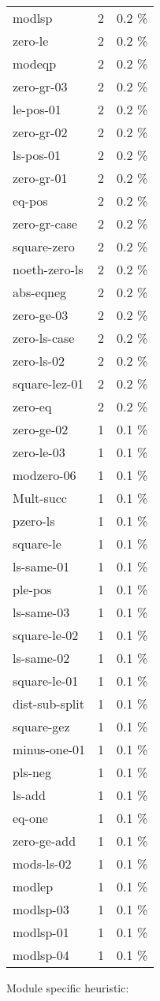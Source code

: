\documentclass[a4paper]{article}
\begin{document}
\begin{supertabular}{l|r|r}
modlsp & 2 & 0.2 \% \\
zero-le & 2 & 0.2 \% \\
modeqp & 2 & 0.2 \% \\
zero-gr-03 & 2 & 0.2 \% \\
le-pos-01 & 2 & 0.2 \% \\
zero-gr-02 & 2 & 0.2 \% \\
ls-pos-01 & 2 & 0.2 \% \\
zero-gr-01 & 2 & 0.2 \% \\
eq-pos & 2 & 0.2 \% \\
zero-gr-case & 2 & 0.2 \% \\
square-zero & 2 & 0.2 \% \\
noeth-zero-ls & 2 & 0.2 \% \\
abs-eqneg & 2 & 0.2 \% \\
zero-ge-03 & 2 & 0.2 \% \\
zero-ls-case & 2 & 0.2 \% \\
zero-ls-02 & 2 & 0.2 \% \\
square-lez-01 & 2 & 0.2 \% \\
zero-eq & 2 & 0.2 \% \\
zero-ge-02 & 1 & 0.1 \% \\
zero-le-03 & 1 & 0.1 \% \\
modzero-06 & 1 & 0.1 \% \\
Mult-succ & 1 & 0.1 \% \\
pzero-ls & 1 & 0.1 \% \\
square-le & 1 & 0.1 \% \\
ls-same-01 & 1 & 0.1 \% \\
ple-pos & 1 & 0.1 \% \\
ls-same-03 & 1 & 0.1 \% \\
square-le-02 & 1 & 0.1 \% \\
ls-same-02 & 1 & 0.1 \% \\
square-le-01 & 1 & 0.1 \% \\
dist-sub-split & 1 & 0.1 \% \\
square-gez & 1 & 0.1 \% \\
minus-one-01 & 1 & 0.1 \% \\
pls-neg & 1 & 0.1 \% \\
ls-add & 1 & 0.1 \% \\
eq-one & 1 & 0.1 \% \\
zero-ge-add & 1 & 0.1 \% \\
mods-ls-02 & 1 & 0.1 \% \\
modlep & 1 & 0.1 \% \\
modlsp-03 & 1 & 0.1 \% \\
modlsp-01 & 1 & 0.1 \% \\
modlsp-04 & 1 & 0.1 \% \\

\end{supertabular}

Module specific heuristic:
\end{document}
